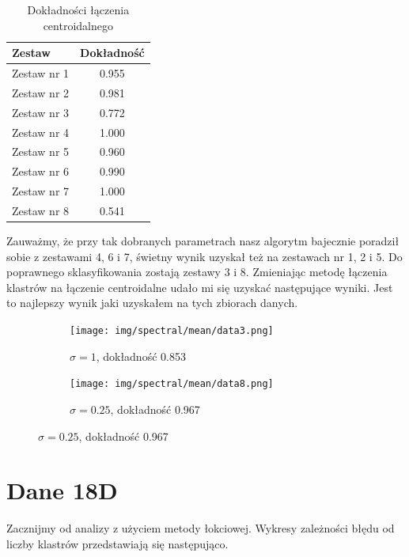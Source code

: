 \documentclass[polish,12pt,a4paper]{extarticle}
\begin{document}
\begin{table}[h!]
\centering
\begin{tabular}{|l|c|}
\hline
\textbf{Zestaw} & \textbf{Dokładność} \\
\hline
Zestaw nr 1 & 0.955 \\
Zestaw nr 2 & 0.981 \\
Zestaw nr 3 & 0.772 \\
Zestaw nr 4 & 1.000 \\
Zestaw nr 5 & 0.960 \\
Zestaw nr 6 & 0.990 \\
Zestaw nr 7 & 1.000 \\
Zestaw nr 8 & 0.541 \\
\hline
\end{tabular}
\caption{Dokładności łączenia centroidalnego}
\end{table}

\noindent Zauważmy, że przy tak dobranych parametrach nasz algorytm bajecznie poradził sobie z zestawami 4, 6 i 7, świetny wynik uzyskał też na zestawach nr 1, 2 i 5. Do poprawnego sklasyfikowania zostają zestawy 3 i 8. Zmieniając metodę łączenia klastrów na łączenie centroidalne udało mi się uzyskać następujące wyniki. Jest to najlepszy wynik jaki uzyskałem na tych zbiorach danych.

\begin{figure}[h!]
    \centering
    \begin{subfigure}[b]{0.30\textwidth}
        \texttt{[image: img/spectral/mean/data3.png]}
        \captionsetup{labelformat=empty}
        \caption{$\sigma = 1$, dokładność 0.853}
    \end{subfigure}
    \hspace{}
    \begin{subfigure}[b]{0.30\textwidth}
        \texttt{[image: img/spectral/mean/data8.png]}
        \captionsetup{labelformat=empty}
        \caption{$\sigma = 0.25$, dokładność 0.967}
    \end{subfigure}

    \label{fig:data_grid}
\end{figure} \FloatBarrier

\section{Dane 18D}
Zacznijmy od analizy z użyciem metody łokciowej. Wykresy zależności błędu od liczby klastrów przedstawiają się następująco.
\end{document}
